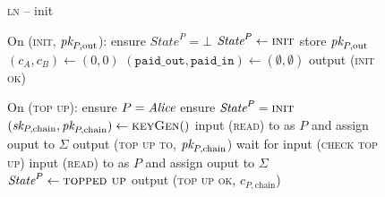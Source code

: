 \begin{figure}[H]
  \begin{processbox}{\textsc{ln} -- init}
    \begin{algorithmic}[1]
      \State {}
      \State {}
      \State On (\textsc{init}, $\textit{pk}_{P, \mathrm{out}}$):
      \Indent
        \State ensure $\textit{State}^P = \bot$
        \State $\textit{State}^P \gets \textsc{init}$
        \State store $\textit{pk}_{P, \mathrm{out}}$
        \State $(c_A, c_B) \gets (0, 0)$
        \State $(\texttt{paid\_out}, \texttt{paid\_in}) \gets (\emptyset,
        \emptyset)$
        \State output (\textsc{init ok})
      \EndIndent
      \Statex

      \State On (\textsc{top up}):
      \Indent
        \State ensure $P = \mathit{Alice}$ 
        \State ensure $\textit{State}^P = \textsc{init}$
        \State $(\textit{sk}_{P, \mathrm{chain}}, \textit{pk}_{P, \mathrm{chain}}) \gets
        \textsc{keyGen}()$
        \State input (\textsc{read}) to \ledger as $P$ and assign ouput to
        $\Sigma$
        \State output (\textsc{top up to}, $\textit{pk}_{P, \mathrm{chain}}$)
          \State {}
          \State wait for input (\textsc{check top up})
          \State input (\textsc{read}) to \ledger as $P$ and assign ouput to
          $\Sigma$
        \EndWhile
        \State $\textit{State}^P \gets \textsc{topped up}$
        \State output (\textsc{top up ok}, $c_{P, \mathrm{chain}}$)
      \EndIndent
    \end{algorithmic}
  \end{processbox}
  \caption{}
  \label{code:ln:init}
\end{figure}

